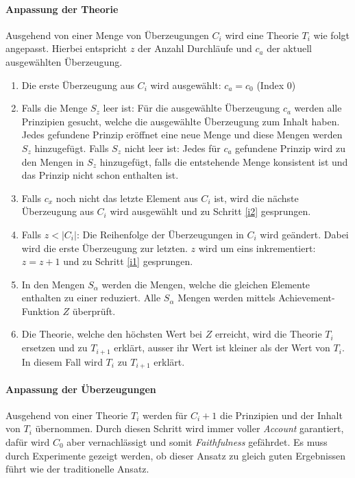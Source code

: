 \documentclass{article}
\begin{document}
\paragraph{Anpassung der Theorie}
Ausgehend von einer Menge von Überzeugungen $C_i$ wird eine Theorie $T_i$ wie folgt angepasst. Hierbei entspricht $z$ der Anzahl Durchläufe und $c_a$ der aktuell ausgewählten Überzeugung. 
\begin{enumerate}
    \item \label{i1} Die erste Überzeugung aus $C_i$ wird ausgewählt: $c_a = c_0$ (Index 0)
    \item \label{i2} Falls die Menge $S_z$ leer ist: Für die ausgewählte Überzeugung $c_a$ werden alle Prinzipien gesucht, welche die ausgewählte Überzeugung zum Inhalt haben. Jedes gefundene Prinzip eröffnet eine neue Menge und diese Mengen werden $S_z$ hinzugefügt. Falls $S_z$ nicht leer ist: Jedes für $c_a$ gefundene Prinzip wird zu den Mengen in $S_z$ hinzugefügt, falls die entstehende Menge konsistent ist und das Prinzip nicht schon enthalten ist.
    \item \label{i3} Falls $c_x$ noch nicht das letzte Element aus $C_i$ ist, wird die nächste Überzeugung aus $C_i$ wird ausgewählt und zu Schritt \ref{i2} gesprungen.
    \item \label{i4} Falls $z < \lvert C_i \rvert$: Die Reihenfolge der Überzeugungen in $C_i$ wird geändert. Dabei wird die erste Überzeugung zur letzten. $z$ wird um eins inkrementiert: $z = z + 1$ und zu Schritt \ref{i1} gesprungen. %
    \item \label{i5} In den Mengen $S_\alpha$ werden die Mengen, welche die gleichen Elemente enthalten zu einer reduziert. Alle $S_\alpha$ Mengen werden mittels Achievement-Funktion $Z$ überprüft.
    \item \label{i6}Die Theorie, welche den höchsten Wert bei $Z$ erreicht, wird die Theorie $T_i$ ersetzen und zu $T_{i+1}$ erklärt, ausser ihr Wert ist kleiner als der Wert von $T_i$. In diesem Fall wird $T_i$ zu $T_{i+1}$ erklärt.
\end{enumerate}

\paragraph{Anpassung der Überzeugungen}
Ausgehend von einer Theorie $T_i$ werden für $C_i+1$ die Prinzipien und der Inhalt von $T_i$ übernommen.
Durch diesen Schritt wird immer voller \textit{Account} garantiert, dafür wird $C_0$ aber vernachlässigt und somit \textit{Faithfulness} gefährdet. Es muss durch Experimente gezeigt werden, ob dieser Ansatz zu gleich guten Ergebnissen führt wie der traditionelle Ansatz.
\end{document}
